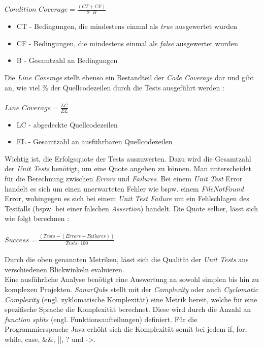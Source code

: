 $Condition \,\, Coverage = \frac{(CT + CF)}{2 \cdot B}$
\begin{itemize}
    \setlength{\parskip}{1pt}
    \item CT - Bedingungen, die mindestens einmal als \textit{true} ausgewertet wurden
    \item CF - Bedingungen, die mindestens einmal als \textit{false} ausgewertet wurden
    \item B - Gesamtzahl an Bedingungen
\end{itemize}
Die \textit{Line Coverage} stellt ebenso ein Bestandteil der \textit{Code Coverage} dar und gibt an, wie viel \% der Quellcodezeilen durch die Tests ausgeführt werden \cite*{MetricDefinition}:\\\\
$Line \,\, Coverage = \frac{LC}{EL}$
\begin{itemize}
    \setlength{\parskip}{1pt}
    \item LC - abgedeckte Quellcodezeilen
    \item EL - Gesamtzahl an ausführbaren Quellcodezeilen
\end{itemize}
Wichtig ist, die Erfolgsquote der Tests auszuwerten. Dazu wird die Gesamtzahl der \textit{Unit Tests} benötigt, um eine Quote angeben zu können. Man unterscheidet für die Berechnung zwischen \textit{Errors} und \textit{Failures}. Bei einem \textit{Unit Test} Error handelt es sich um einen unerwarteten Fehler wie bspw. einem \textit{FileNotFound} Error, wohingegen es sich bei einem \textit{Unit Test Failure} um ein Fehlschlagen des Testfalls (bspw. bei einer falschen \textit{Assertion}) handelt. Die Quote selber, lässt sich wie folgt berechnen \cite*{MetricDefinition}:\\\\
$Success = \frac{(Tests - (Errors + Failures))}{Tests \cdot 100}$\\\\
Durch die oben genannten Metriken, lässt sich die Qualität der \textit{Unit Tests} aus verschiedenen Blickwinkeln evaluieren.\\
Eine ausführliche Analyse benötigt eine Auswertung an sowohl simplen bis hin zu komplexen Projekten. \textit{SonarQube} stellt mit der \textit{Complexity} oder auch \textit{Cyclomatic Complexity} (engl. zyklomatische Komplexität) eine Metrik bereit, welche für eine spezifische Sprache die Komplexität berechnet. Diese wird durch die Anzahl an \textit{function splits} (engl. Funktionsaufteilungen) definiert. Für die Programmiersprache Java erhöht sich die Komplexität somit bei jedem \colorbox{gray!20}{if}, \colorbox{gray!20}{for}, \colorbox{gray!20}{while}, \colorbox{gray!20}{case}, \colorbox{gray!20}{\&\&}, \colorbox{gray!20}{||}, \colorbox{gray!20}{?} und \colorbox{gray!20}{->}. \cite*{MetricDefinition}
